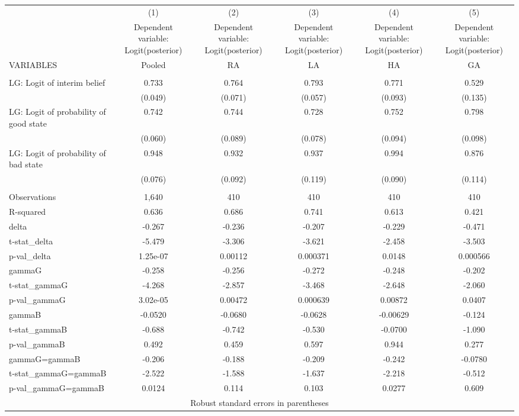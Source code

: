 \documentclass[]{article}
\begin{document}
\begin{tabular}{lccccc} \hline
 & (1) & (2) & (3) & (4) & (5) \\
 & Dependent variable: Logit(posterior) & Dependent variable: Logit(posterior) & Dependent variable: Logit(posterior) & Dependent variable: Logit(posterior) & Dependent variable: Logit(posterior) \\
VARIABLES & Pooled & RA & LA & HA & GA \\ \hline
 &  &  &  &  &  \\
LG: Logit of interim belief & 0.733 & 0.764 & 0.793 & 0.771 & 0.529 \\
 & (0.049) & (0.071) & (0.057) & (0.093) & (0.135) \\
LG: Logit of probability of good state & 0.742 & 0.744 & 0.728 & 0.752 & 0.798 \\
 & (0.060) & (0.089) & (0.078) & (0.094) & (0.098) \\
LG: Logit of probability of bad state & 0.948 & 0.932 & 0.937 & 0.994 & 0.876 \\
 & (0.076) & (0.092) & (0.119) & (0.090) & (0.114) \\
 &  &  &  &  &  \\
Observations & 1,640 & 410 & 410 & 410 & 410 \\
R-squared & 0.636 & 0.686 & 0.741 & 0.613 & 0.421 \\
delta & -0.267 & -0.236 & -0.207 & -0.229 & -0.471 \\
t-stat\_delta & -5.479 & -3.306 & -3.621 & -2.458 & -3.503 \\
p-val\_delta & 1.25e-07 & 0.00112 & 0.000371 & 0.0148 & 0.000566 \\
gammaG & -0.258 & -0.256 & -0.272 & -0.248 & -0.202 \\
t-stat\_gammaG & -4.268 & -2.857 & -3.468 & -2.648 & -2.060 \\
p-val\_gammaG & 3.02e-05 & 0.00472 & 0.000639 & 0.00872 & 0.0407 \\
gammaB & -0.0520 & -0.0680 & -0.0628 & -0.00629 & -0.124 \\
t-stat\_gammaB & -0.688 & -0.742 & -0.530 & -0.0700 & -1.090 \\
p-val\_gammaB & 0.492 & 0.459 & 0.597 & 0.944 & 0.277 \\
gammaG=gammaB & -0.206 & -0.188 & -0.209 & -0.242 & -0.0780 \\
t-stat\_gammaG=gammaB & -2.522 & -1.588 & -1.637 & -2.218 & -0.512 \\
 p-val\_gammaG=gammaB & 0.0124 & 0.114 & 0.103 & 0.0277 & 0.609 \\ \hline
\multicolumn{6}{c}{ Robust standard errors in parentheses} \\
\end{tabular}
\end{document}
